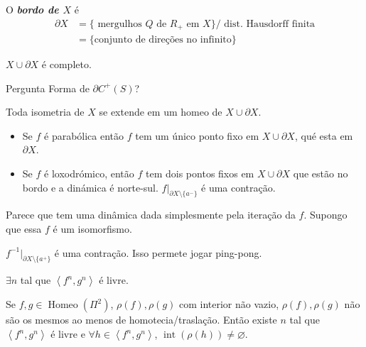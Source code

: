 \begin{defn}\leavevmode
	O \textit{\textbf{bordo de $X$}} é
\begin{align*}\partial X&=\{\text{ mergulhos $Q$ de $R_+$ em $X$} \} \Big/\text{ dist. Hausdorff finita}\\
	&=\{\text{conjunto de direções no infinito} \}
	\end{align*}
\end{defn}

\begin{prop}\leavevmode
	$X\cup  \partial X$ é completo.
\end{prop}

\begin{thing6}{Pergunta}\leavevmode
	Forma de $\partial C^+(S)$?
\end{thing6}

\begin{remark}\leavevmode
	Toda isometria de $X$ se extende em um homeo de $X\cup \partial X$.
\end{remark}

\begin{thm}[Gromov]\leavevmode
	\begin{itemize}
	\item Se $f$ é parabólica então $f$ tem um único ponto fixo em $X\cup \partial X$, qué esta em $\partial X$.

	\item Se $f$ é loxodrómico, então $f$ tem dois pontos fixos em $X \cup \partial X$ que estão no bordo e a dinámica é norte-sul. $f\Big|_{\partial X\setminus \{a^-\}}$ é uma contração.
	\end{itemize}
\end{thm}

\begin{remark}[Dani]\leavevmode
	Parece que tem uma dinâmica dada simplesmente pela iteração da $f$. Supongo que essa $f$ é um isomorfismo.
\end{remark}

$f^{-1}|_{\partial X\setminus \{a^+\}}$ é uma contração. Isso permete jogar ping-pong.

\begin{exercise}\leavevmode
	$\exists n$ tal que $\left<f^n,g^n\right> $ é livre.
\end{exercise}

\begin{thm}\leavevmode
	Se $f,g\in\operatorname{Homeo}(\Pi^2)$, $\rho(f),\rho(g)$ com interior não vazio, $\rho(f),\rho(g)$ não são os mesmos ao menos de homotecia/traslação. Então existe $n$ tal que  $\left<f^n,g^n\right> $ é livre e $\forall h\in\left<f^n,g^n\right> $, $\operatorname{i n t}(\rho(h))\neq \varnothing$.
\end{thm}

